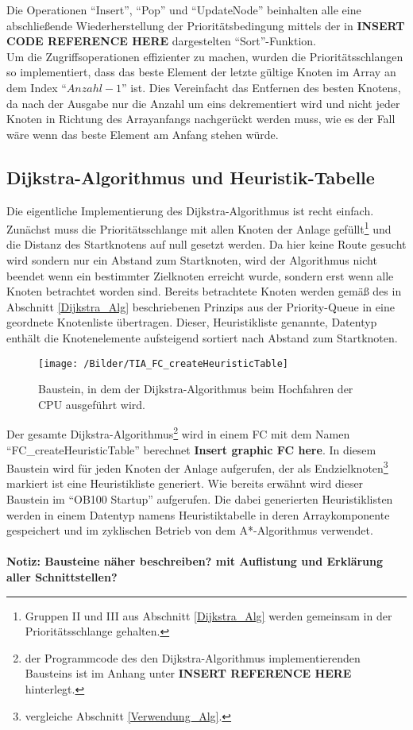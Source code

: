 			Die Operationen "`Insert"', "`Pop"' und "`UpdateNode"' beinhalten alle eine abschließende Wiederherstellung  der Prioritätsbedingung mittels der in \textbf{INSERT CODE REFERENCE HERE} dargestelten "`Sort"'-Funktion.\\
			Um die Zugriffsoperationen effizienter zu machen, wurden die Prioritätsschlangen so implementiert, dass das beste Element der letzte gültige Knoten im Array an dem Index "`$Anzahl - 1$"' ist. Dies Vereinfacht das Entfernen des besten Knotens, da nach der Ausgabe nur die Anzahl um eins dekrementiert wird und nicht jeder Knoten in Richtung des Arrayanfangs nachgerückt werden muss, wie es der Fall wäre wenn das beste Element am Anfang stehen würde.
			
		\subsection{Dijkstra-Algorithmus und Heuristik-Tabelle}
			
			Die eigentliche Implementierung des Dijkstra-Algorithmus ist recht einfach. Zunächst muss die Prioritätsschlange mit allen Knoten der Anlage gefüllt\footnote{Gruppen II und III aus Abschnitt \ref{Dijkstra_Alg} werden gemeinsam in der Prioritätsschlange gehalten.} und die Distanz des Startknotens auf null gesetzt werden. 
			Da hier keine Route gesucht wird sondern nur ein Abstand zum Startknoten, wird der Algorithmus nicht beendet wenn ein bestimmter Zielknoten erreicht wurde, sondern erst wenn alle Knoten betrachtet worden sind. Bereits betrachtete Knoten werden gemäß des in Abschnitt \ref{Dijkstra_Alg} beschriebenen Prinzips aus der Priority-Queue in eine geordnete Knotenliste übertragen. Dieser, Heuristikliste genannte, Datentyp enthält die Knotenelemente aufsteigend sortiert nach Abstand zum Startknoten.
			
			\begin{figure}[h]
				\centering
				\texttt{[image: /Bilder/TIA\_FC\_createHeuristicTable]}
				\vspace{0.2cm}
				\caption{Baustein, in dem der Dijkstra-Algorithmus beim Hochfahren der CPU ausgeführt wird.}
				
			\end{figure}
			Der gesamte Dijkstra-Algorithmus\footnote{der Programmcode des den Dijkstra-Algorithmus implementierenden Bausteins ist im Anhang unter \textbf{INSERT REFERENCE HERE} hinterlegt.} wird in einem \ac{FC} mit dem Namen "`FC\_createHeuristicTable"' berechnet \textbf{Insert graphic FC here}. In diesem Baustein wird für jeden Knoten der Anlage aufgerufen, der als Endzielknoten\footnote{vergleiche Abschnitt \ref{Verwendung_Alg}.} markiert ist eine Heuristikliste generiert. Wie bereits erwähnt wird dieser Baustein im "`\ac{OB}100 Startup"' aufgerufen. Die dabei generierten Heuristiklisten werden in einem Datentyp namens Heuristiktabelle in deren Arraykomponente gespeichert und im zyklischen Betrieb von dem A*-Algorithmus verwendet. 
			\\
			\\
			\textbf{Notiz: Bausteine näher beschreiben? mit Auflistung und Erklärung aller Schnittstellen?}
			

